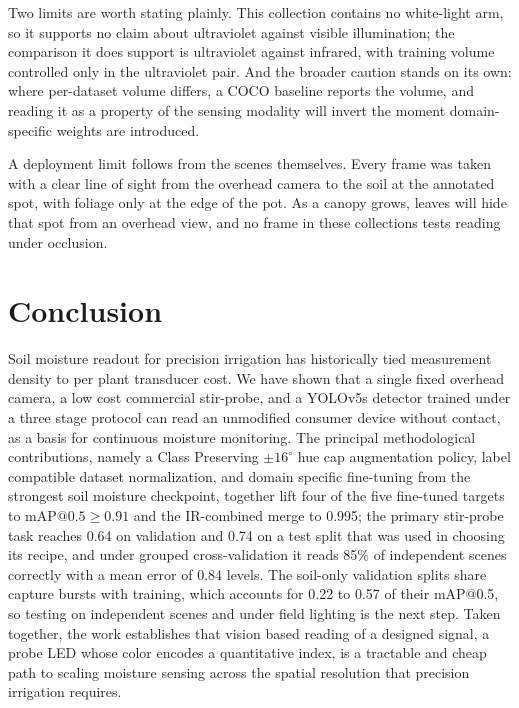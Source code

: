 ﻿\documentclass[journal]{IEEEtran}
\begin{document}
Two limits are worth stating plainly. This collection contains no white-light arm, so it supports no claim about ultraviolet against visible illumination; the comparison it does support is ultraviolet against infrared, with training volume controlled only in the ultraviolet pair. And the broader caution stands on its own: where per-dataset volume differs, a COCO baseline reports the volume, and reading it as a property of the sensing modality will invert the moment domain-specific weights are introduced.

A deployment limit follows from the scenes themselves. Every frame was taken with a clear line of sight from the overhead camera to the soil at the annotated spot, with foliage only at the edge of the pot. As a canopy grows, leaves will hide that spot from an overhead view, and no frame in these collections tests reading under occlusion.

\section{Conclusion}
\label{sec:conclusion}
Soil moisture readout for precision irrigation has historically tied measurement density to per plant transducer cost. We have shown that a single fixed overhead camera, a low cost commercial stir-probe, and a YOLOv5s detector trained under a three stage protocol can read an unmodified consumer device without contact, as a basis for continuous moisture monitoring. The principal methodological contributions, namely a Class Preserving $\pm 16^{\circ}$ hue cap augmentation policy, label compatible dataset normalization, and domain specific fine-tuning from the strongest soil moisture checkpoint, together lift four of the five fine-tuned targets to $\text{mAP@0.5} \geq 0.91$ and the IR-combined merge to 0.995; the primary stir-probe task reaches 0.64 on validation and 0.74 on a test split that was used in choosing its recipe, and under grouped cross-validation it reads 85\% of independent scenes correctly with a mean error of 0.84 levels. The soil-only validation splits share capture bursts with training, which accounts for 0.22 to 0.57 of their mAP@0.5, so testing on independent scenes and under field lighting is the next step. Taken together, the work establishes that vision based reading of a designed signal, a probe LED whose color encodes a quantitative index, is a tractable and cheap path to scaling moisture sensing across the spatial resolution that precision irrigation requires.



\end{document}
